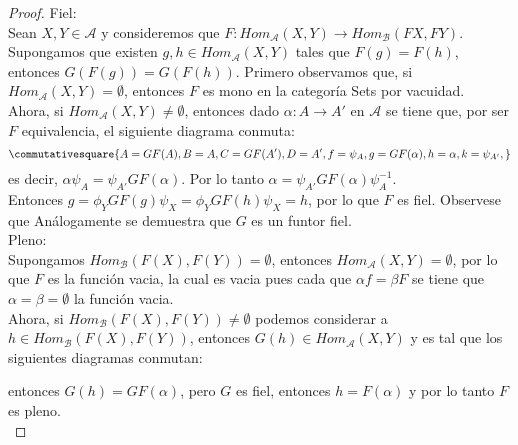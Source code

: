 \documentclass{article}
\begin{document}
\begin{enumerate}[label=\textbf{Ej \arabic*.}]
\begin{proof}
Fiel: \\
Sean $X,Y\in \mathscr{A}$ y consideremos que $F\colon Hom_{\mathscr{A}}(X,Y)\longrightarrow Hom_{\mathscr{B}}(FX,FY)$.
Supongamos que existen $g,h\in Hom_{\mathscr{A}}(X,Y)$ tales que $F(g)=F(h)$, entonces $G(F(g))=G(F(h))$. 
Primero observamos que, si $Hom_{\mathscr{A}}(X,Y)=\emptyset$, entonces $F$ es mono en la categoría Sets por vacuidad.\\

Ahora, si $Hom_{\mathscr{A}}(X,Y)\neq \emptyset$, entonces dado $\alpha\colon A\longrightarrow A'$ en $\mathscr{A}$ se tiene que, por ser $F$ 
equivalencia, el siguiente diagrama conmuta:
\begin{equation*}	\commutativesquare{A=GF(A),B=A,C=GF(A'),D=A',f=\psi_A,
g=GF(\alpha),h=\alpha,k=\psi_{A'},}
\end{equation*}
es decir, $\alpha \psi_A=\psi_{A'}GF(\alpha)$. Por lo tanto $\alpha=\psi_{A'}GF(\alpha)\psi^{-1}_A$.\\

Entonces $g=\phi_YGF(g)\psi_X=\phi_YGF(h)\psi_X=h$, por lo que $F$ es fiel. Observese que Análogamente se demuestra que $G$ es un funtor fiel.\\

Pleno:\\
Supongamos $Hom_{\mathscr{B}}(F(X),F(Y))=\emptyset$, entonces $Hom_{\mathscr{A}}(X,Y)=\emptyset$, por lo que $F$ es la función vacia, la cual
es vacia pues cada que $\alpha f= \beta F$ se tiene que $\alpha=\beta=\emptyset$ la función vacia.\\
Ahora, si $Hom_{\mathscr{B}}(F(X),F(Y))\neq \emptyset$ podemos considerar a $h\in Hom_{\mathscr{B}}(F(X),F(Y))$, entonces 
$G(h)\in Hom_{\mathscr{A}}(X,Y)$ y es tal que los siguientes diagramas conmutan:


\centerline{}
entonces $G(h)=GF(\alpha)$, pero $G$ es fiel, entonces $h=F(\alpha)$ y por lo tanto $F$ es pleno.\\


\end{proof}
\end{enumerate}
\end{document}
